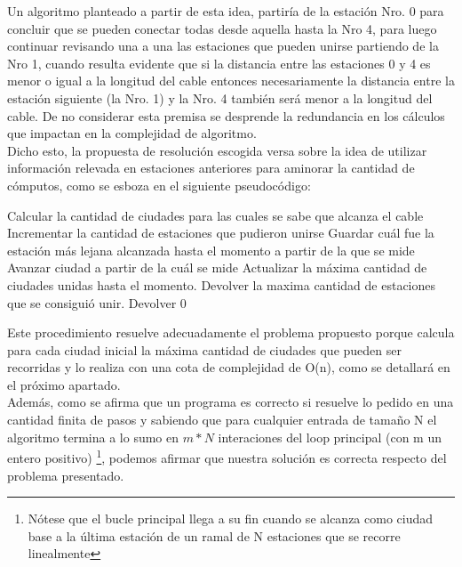 Un algoritmo planteado a partir de esta idea, partiría de la estación Nro. 0 para concluir que se pueden conectar todas desde aquella hasta la Nro 4, para luego continuar revisando una a una las estaciones que pueden unirse partiendo de la Nro 1, cuando resulta evidente que si la distancia entre las estaciones  0 y 4 es menor o igual a la longitud del cable entonces necesariamente la distancia entre la estación siguiente (la Nro. 1) y la Nro. 4 también será menor a la longitud del cable. De no considerar esta premisa se desprende la redundancia en los cálculos que impactan en la complejidad de algoritmo. \\
 
Dicho esto, la propuesta de resolución escogida versa sobre la idea de utilizar información relevada en estaciones anteriores para aminorar la cantidad de cómputos, como se esboza en el siguiente pseudocódigo:


\begin{algorithmic} 
	
		\STATE Calcular la cantidad de ciudades para las cuales se sabe que alcanza el cable
			\STATE Incrementar la cantidad de estaciones que pudieron unirse
			\STATE Guardar cuál fue la estación más lejana alcanzada hasta el momento a partir de la que se mide
		\ENDWHILE
		\STATE Avanzar ciudad a partir de la cuál se mide
		\STATE Actualizar la máxima cantidad de ciudades unidas hasta el momento.
	\ENDWHILE
		\STATE Devolver la maxima cantidad de estaciones que se consiguió unir.
	\ELSE
		\STATE Devolver 0
	\ENDIF
\ENDIF
\end{algorithmic}

Este procedimiento resuelve adecuadamente el problema propuesto porque calcula para cada ciudad inicial la máxima cantidad de ciudades que pueden ser recorridas y lo realiza con una cota de complejidad de O(n), como se detallará en el próximo apartado.\\
Además, como se afirma que un programa es correcto si resuelve lo pedido en una cantidad finita de pasos y sabiendo que para cualquier entrada de tama\~no N el algoritmo termina a lo sumo en $m*N$ interaciones del loop principal (con m un entero positivo) \footnote{Nótese que el bucle principal llega a su fin cuando se alcanza como ciudad base a la última estación de un ramal de N estaciones que se recorre linealmente}, podemos afirmar que nuestra solución es correcta respecto del problema presentado.\\

